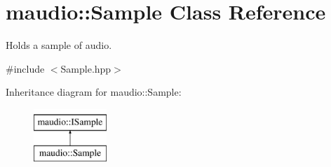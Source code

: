 \hypertarget{classmaudio_1_1Sample}{\section{maudio\-:\-:Sample Class Reference}
\label{classmaudio_1_1Sample}
}


Holds a sample of audio.  




{\ttfamily \#include $<$Sample.\-hpp$>$}

Inheritance diagram for maudio\-:\-:Sample\-:\begin{figure}[H]
\begin{center}
\leavevmode
\includegraphics[height=2.000000cm]{classmaudio_1_1Sample}
\end{center}
\end{figure}
